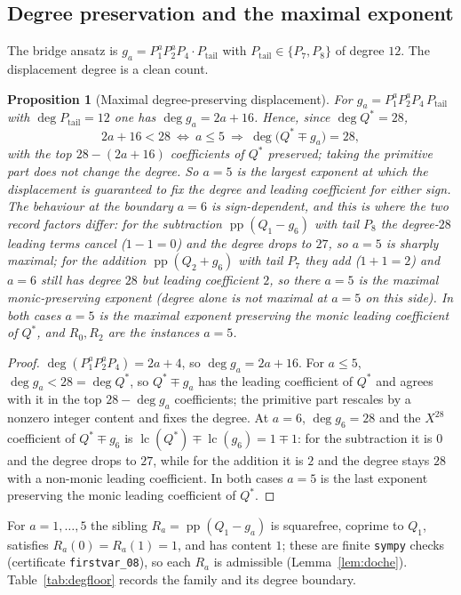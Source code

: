 \documentclass[11pt,reqno]{amsart}
\theoremstyle{plain}
\newtheorem{proposition}[theorem]{Proposition}
\theoremstyle{definition}
\theoremstyle{remark}
\DeclareMathOperator{\pp}{pp}
\begin{document}
\subsection*{Degree preservation and the maximal exponent}
The bridge ansatz is $g_a=P_1^aP_2^aP_4\cdot P_{\mathrm{tail}}$ with
$P_{\mathrm{tail}}\in\{P_7,P_8\}$ of degree $12$. The displacement degree is a clean
count.

\begin{proposition}[Maximal degree-preserving displacement]\label{prop:degfloor}
For $g_a=P_1^aP_2^aP_4\,P_{\mathrm{tail}}$ with $\deg P_{\mathrm{tail}}=12$ one has
$\deg g_a=2a+16$. Hence, since $\deg Q^*=28$,
\[
  2a+16<28\ \Longleftrightarrow\ a\le5\ \Longrightarrow\ \deg\bigl(Q^*\mp g_a\bigr)=28 ,
\]
with the top $28-(2a+16)$ coefficients of $Q^*$ preserved; taking the primitive part does
not change the degree. So $a=5$ is the largest exponent at which the displacement is
guaranteed to fix the degree and leading coefficient \emph{for either sign}. The
behaviour at the boundary $a=6$ is sign-dependent, and this is where the two record
factors differ: for the subtraction $\pp(Q_1-g_6)$ with tail $P_8$ the degree-$28$
leading terms cancel ($1-1=0$) and the degree drops to $27$, so $a=5$ is sharply maximal;
for the addition $\pp(Q_2+g_6)$ with tail $P_7$ they add ($1+1=2$) and $a=6$ still has
degree $28$ but leading coefficient $2$, so there $a=5$ is the maximal
\emph{monic}-preserving exponent (degree alone is not maximal at $a=5$ on this side).
In both cases $a=5$ is the maximal exponent preserving the \emph{monic leading
coefficient} of $Q^*$, and $R_0,R_2$ are the instances $a=5$.
\end{proposition}

\begin{proof}
$\deg(P_1^aP_2^aP_4)=2a+4$, so $\deg g_a=2a+16$. For $a\le5$, $\deg g_a<28=\deg Q^*$, so
$Q^*\mp g_a$ has the leading coefficient of $Q^*$ and agrees with it in the top
$28-\deg g_a$ coefficients; the primitive part rescales by a nonzero integer content and
fixes the degree. At $a=6$, $\deg g_6=28$ and the $X^{28}$ coefficient of $Q^*\mp g_6$ is
$\operatorname{lc}(Q^*)\mp\operatorname{lc}(g_6)=1\mp1$: for the subtraction it is $0$ and
the degree drops to $27$, while for the addition it is $2$ and the degree stays $28$ with
a non-monic leading coefficient. In both cases $a=5$ is the last exponent preserving the
monic leading coefficient of $Q^*$.
\end{proof}

For $a=1,\dots,5$ the sibling $R_a=\pp(Q_1-g_a)$ is squarefree, coprime to $Q_1$,
satisfies $R_a(0)=R_a(1)=1$, and has content $1$; these are finite \texttt{sympy} checks
(certificate \texttt{firstvar\_08}), so each $R_a$ is admissible
(Lemma~\ref{lem:doche}). Table~\ref{tab:degfloor} records the family and its degree
boundary.
\end{document}
